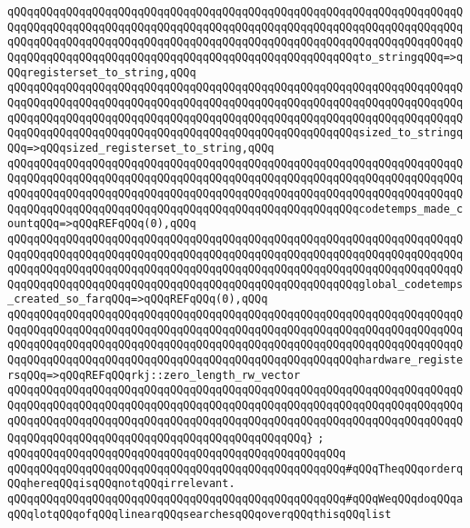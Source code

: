 \verb|qQQqqQQqqQQqqQQqqQQqqQQqqQQqqQQqqQQqqQQqqQQqqQQqqQQqqQQqqQQqqQQqqQQqqQQqqQQqqQQqqQQqqQQqqQQqqQQqqQQqqQQqqQQqqQQqqQQqqQQqqQQqqQQqqQQqqQQqqQQqqQQqqQQqqQQqqQQqqQQqqQQqqQQqqQQqqQQqqQQqqQQqqQQqqQQqqQQqqQQqqQQqqQQqqQQqqQQqqQQqqQQqqQQqqQQqqQQqqQQqqQQqqQQqqQQqqQQqqQQqqQQqto_stringqQQq=>qQQqregisterset_to_string,qQQq|\newline
\verb|qQQqqQQqqQQqqQQqqQQqqQQqqQQqqQQqqQQqqQQqqQQqqQQqqQQqqQQqqQQqqQQqqQQqqQQqqQQqqQQqqQQqqQQqqQQqqQQqqQQqqQQqqQQqqQQqqQQqqQQqqQQqqQQqqQQqqQQqqQQqqQQqqQQqqQQqqQQqqQQqqQQqqQQqqQQqqQQqqQQqqQQqqQQqqQQqqQQqqQQqqQQqqQQqqQQqqQQqqQQqqQQqqQQqqQQqqQQqqQQqqQQqqQQqqQQqqQQqqQQqqQQqsized_to_stringqQQq=>qQQqsized_registerset_to_string,qQQq|\newline
\verb|qQQqqQQqqQQqqQQqqQQqqQQqqQQqqQQqqQQqqQQqqQQqqQQqqQQqqQQqqQQqqQQqqQQqqQQqqQQqqQQqqQQqqQQqqQQqqQQqqQQqqQQqqQQqqQQqqQQqqQQqqQQqqQQqqQQqqQQqqQQqqQQqqQQqqQQqqQQqqQQqqQQqqQQqqQQqqQQqqQQqqQQqqQQqqQQqqQQqqQQqqQQqqQQqqQQqqQQqqQQqqQQqqQQqqQQqqQQqqQQqqQQqqQQqqQQqqQQqqQQqqQQqcodetemps_made_countqQQq=>qQQqREFqQQq(0),qQQq|\newline
\verb|qQQqqQQqqQQqqQQqqQQqqQQqqQQqqQQqqQQqqQQqqQQqqQQqqQQqqQQqqQQqqQQqqQQqqQQqqQQqqQQqqQQqqQQqqQQqqQQqqQQqqQQqqQQqqQQqqQQqqQQqqQQqqQQqqQQqqQQqqQQqqQQqqQQqqQQqqQQqqQQqqQQqqQQqqQQqqQQqqQQqqQQqqQQqqQQqqQQqqQQqqQQqqQQqqQQqqQQqqQQqqQQqqQQqqQQqqQQqqQQqqQQqqQQqqQQqqQQqqQQqqQQqglobal_codetemps_created_so_farqQQq=>qQQqREFqQQq(0),qQQq|\newline
\verb|qQQqqQQqqQQqqQQqqQQqqQQqqQQqqQQqqQQqqQQqqQQqqQQqqQQqqQQqqQQqqQQqqQQqqQQqqQQqqQQqqQQqqQQqqQQqqQQqqQQqqQQqqQQqqQQqqQQqqQQqqQQqqQQqqQQqqQQqqQQqqQQqqQQqqQQqqQQqqQQqqQQqqQQqqQQqqQQqqQQqqQQqqQQqqQQqqQQqqQQqqQQqqQQqqQQqqQQqqQQqqQQqqQQqqQQqqQQqqQQqqQQqqQQqqQQqqQQqqQQqqQQqhardware_registersqQQq=>qQQqREFqQQqrkj::zero_length_rw_vector|\newline
\verb|qQQqqQQqqQQqqQQqqQQqqQQqqQQqqQQqqQQqqQQqqQQqqQQqqQQqqQQqqQQqqQQqqQQqqQQqqQQqqQQqqQQqqQQqqQQqqQQqqQQqqQQqqQQqqQQqqQQqqQQqqQQqqQQqqQQqqQQqqQQqqQQqqQQqqQQqqQQqqQQqqQQqqQQqqQQqqQQqqQQqqQQqqQQqqQQqqQQqqQQqqQQqqQQqqQQqqQQqqQQqqQQqqQQqqQQqqQQqqQQqqQQqqQQqqQQqqQQq}|\newline
\verb|;|\newline
\verb|qQQqqQQqqQQqqQQqqQQqqQQqqQQqqQQqqQQqqQQqqQQqqQQqqQQq|\newline
\verb|qQQqqQQqqQQqqQQqqQQqqQQqqQQqqQQqqQQqqQQqqQQqqQQqqQQq#qQQqTheqQQqorderqQQqhereqQQqisqQQqnotqQQqirrelevant.|\newline
\verb|qQQqqQQqqQQqqQQqqQQqqQQqqQQqqQQqqQQqqQQqqQQqqQQqqQQq#qQQqWeqQQqdoqQQqaqQQqlotqQQqofqQQqlinearqQQqsearchesqQQqoverqQQqthisqQQqlist|\newline
